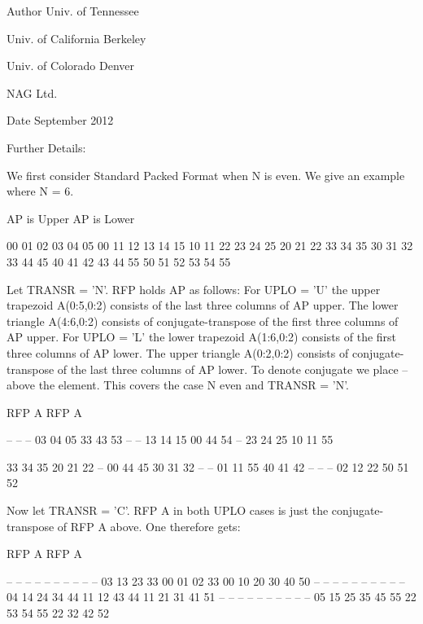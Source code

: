 \begin{DoxyAuthor}{Author}
Univ. of Tennessee 

Univ. of California Berkeley 

Univ. of Colorado Denver 

N\+A\+G Ltd. 
\end{DoxyAuthor}
\begin{DoxyDate}{Date}
September 2012 
\end{DoxyDate}
\begin{DoxyParagraph}{Further Details\+: }
\begin{DoxyVerb}  We first consider Standard Packed Format when N is even.
  We give an example where N = 6.

      AP is Upper             AP is Lower

   00 01 02 03 04 05       00
      11 12 13 14 15       10 11
         22 23 24 25       20 21 22
            33 34 35       30 31 32 33
               44 45       40 41 42 43 44
                  55       50 51 52 53 54 55


  Let TRANSR = 'N'. RFP holds AP as follows:
  For UPLO = 'U' the upper trapezoid A(0:5,0:2) consists of the last
  three columns of AP upper. The lower triangle A(4:6,0:2) consists of
  conjugate-transpose of the first three columns of AP upper.
  For UPLO = 'L' the lower trapezoid A(1:6,0:2) consists of the first
  three columns of AP lower. The upper triangle A(0:2,0:2) consists of
  conjugate-transpose of the last three columns of AP lower.
  To denote conjugate we place -- above the element. This covers the
  case N even and TRANSR = 'N'.

         RFP A                   RFP A

                                -- -- --
        03 04 05                33 43 53
                                   -- --
        13 14 15                00 44 54
                                      --
        23 24 25                10 11 55

        33 34 35                20 21 22
        --
        00 44 45                30 31 32
        -- --
        01 11 55                40 41 42
        -- -- --
        02 12 22                50 51 52

  Now let TRANSR = 'C'. RFP A in both UPLO cases is just the conjugate-
  transpose of RFP A above. One therefore gets:


           RFP A                   RFP A

     -- -- -- --                -- -- -- -- -- --
     03 13 23 33 00 01 02    33 00 10 20 30 40 50
     -- -- -- -- --                -- -- -- -- --
     04 14 24 34 44 11 12    43 44 11 21 31 41 51
     -- -- -- -- -- --                -- -- -- --
     05 15 25 35 45 55 22    53 54 55 22 32 42 52



\end{DoxyVerb}
\end{DoxyParagraph}
